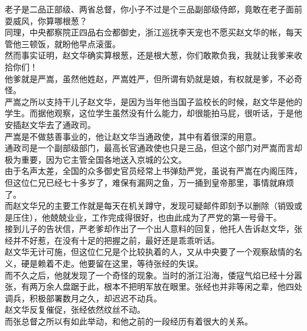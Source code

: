 \begin{multicols}{\theparacolNo}
老子是二品正部级、两省总督，你小子不过是个三品副部级侍郎，竟敢在老子面前耍威风，你算哪根葱？\\

同理，中央都察院正四品右佥都御史，浙江巡抚李天宠也不愿买赵文华的帐，每天管他三顿饭，就盼他早点滚蛋。\\

然而事实证明，赵文华确实算根葱，还是根大葱，你们敢欺负我，我就让我爹来收拾你们！\\

他爹就是严嵩，虽然他姓赵，严嵩姓严，但所谓有奶就是娘，有权就是爹，不必奇怪。\\

严嵩之所以支持干儿子赵文华，是因为当年他当国子监校长的时候，赵文华是他的学生。而据他观察，这位学生虽然没有什么能力，却很能拍马屁，很听话，于是他安插赵文华去了通政司。\\

严嵩是不做慈善事业的，他让赵文华当通政使，其中有着很深的用意。\\

通政司是一个副部级部门，最高长官通政使也只是三品，但这个部门对严嵩而言却极为重要，因为它主管全国各地送入京城的公文。\\

由于名声太差，全国的众多御史官员经常上书弹劾严党，虽说有严嵩在内阁压阵，但这位仁兄已经七十多岁了，难保有漏网之鱼，万一捅到皇帝那里，事情就麻烦了。\\

而赵文华兄的主要工作就是每天在机关蹲守，发现可疑邮件即刻予以删除（销毁或是压住），他兢兢业业，工作完成得很好，也由此成为了严党的第一号骨干。\\

接到儿子的告状信，严老爹却作出了一个出人意料的回复，他托人告诉赵文华，张经并不好惹，在没有十足的把握之前，最好还是乖乖听话。\\

赵文华无计可施，但这位仁兄是个比较执着的人，又从中央要了一个观察敌情的名义，硬是赖着不走。他要留在这里，等待张经的失误。\\

而不久之后，他就发现了一个奇怪的现象。当时的浙江沿海，倭寇气焰已经十分嚣张，有两万余人盘踞于此，根本不把明军放在眼里。张经也并非等闲之辈，他四处调兵，积极部署数月之久，却迟迟不动兵。\\

赵文华反复催促，张经依然纹丝不动。\\

而张总督之所以有如此举动，和他之前的一段经历有着很大的关系。\\


\end{multicols}
